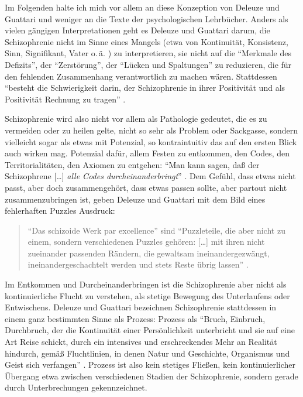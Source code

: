 \documentclass[12pt,
               paper=a4,
               twoside=false,
               onehalfspacing,
               bibliography=totoc,
               toc=graduated,
               ]{scrartcl}
\newcommand{\lips}{\dots\unkern}
\newcommand{\pc}[2]{\parencite[#1]{#2}}
\newcommand{\vgl}[2]{\parencite[vgl.][#1]{#2}}
\newcommand{\worries}[1]{\ifdraft{\textcolor{blue}{\texttt{(#1)}}}{}}
\newcommand{\gwg}{G--W--G'\xspace}
\newcommand{\dg}{Deleuze und Guattari\xspace}
\begin{document}

%

Im Folgenden halte ich mich vor allem an diese Konzeption von \dg und
weniger an die Texte der psychologischen Lehrbücher. Anders als vielen
gängigen Interpretationen geht es Deleuze und Guattari darum, die
Schizophrenie nicht im Sinne eines Mangels (etwa von Kontinuität,
Konsistenz, Sinn, Signifikant, Vater o.\,ä. \vgl{24}{schizg})
zu interpretieren, sie nicht auf die "`Merkmale des Defizits"', der
"`Zerstörung"', der "`Lücken und Spaltungen"' \pc{24}{schizg} zu
reduzieren, die für den fehlenden Zusammenhang verantwortlich zu
machen wären. Stattdessen "`besteht die Schwierigkeit darin, der
Schizophrenie in ihrer Positivität und als Positivität Rechnung zu
tragen"' \pc{24}{schizg}.

Schizophrenie wird also nicht vor allem als Pathologie gedeutet, die
es zu vermeiden oder zu heilen gelte, nicht so sehr als Problem oder
Sackgasse, sondern vielleicht sogar als etwas mit Potenzial, so
kontraintuitiv das auf den ersten Blick auch wirken mag. Potenzial
dafür, allem Festen zu entkommen, den Codes, den Territorialitäten, den
Axiomen zu entgehen: "`Man kann sagen, daß der Schizophrene [\lips]
\emph{alle Codes durcheinanderbringt}"' \pc{S. 22, Hervorh. im
Orig.}{ao}. Dem Gefühl, dass etwas nicht passt, aber doch
zusammengehört, dass etwas passen sollte, aber partout nicht
zusammenzubringen ist, geben \dg mit dem Bild eines fehlerhaften
Puzzles Ausdruck:
%
\begin{spacing}{1}
\begin{quote}
"`Das schizoide Werk par excellence"' \pc{54}{ao} sind "`Puzzleteile,
die aber nicht zu einem, sondern verschiedenen Puzzles gehören:
[\lips] mit ihren nicht zueinander passenden Rändern, die gewaltsam
ineinandergezwängt, ineinandergeschachtelt werden und stets Reste
übrig lassen"' \pc{54}{ao}.
\end{quote}
\end{spacing}

Im Entkommen und Durcheinanderbringen ist die Schizophrenie aber nicht
als kontinuierliche Flucht zu verstehen, als stetige Bewegung des
Unterlaufens oder Entwischens. \dg bezeichnen Schizophrenie
stattdessen in einem ganz bestimmten Sinne als Prozess: Prozess als
"`Bruch, Einbruch, Durchbruch, der die Kontinuität einer
Persönlichkeit unterbricht und sie auf eine Art Reise schickt, durch
ein intensives und erschreckendes \glq Mehr an Realität\grq{}
hindurch, gemäß Fluchtlinien, in denen Natur und Geschichte,
Organismus und Geist sich verfangen"' \pc{28}{schizg}. Prozess ist
also kein stetiges Fließen, kein kontinuierlicher Übergang etwa
zwischen verschiedenen Stadien der Schizophrenie, sondern gerade durch
Unterbrechungen gekennzeichnet.
\end{document}
